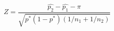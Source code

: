 \documentclass[10pt]{article}
\begin{document}
\[Z=\frac{\hat{p_2}-\hat{p_1}-\pi}{\sqrt{p^*(1-p^*)(1/n_1+1/n_2)}}\]
\end{document}
